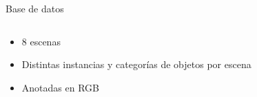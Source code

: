 \documentclass[]{beamer}
\begin{document}
\begin{frame}{Base de datos}
\begin{columns}[t]
\begin{column}{5cm}
            \begin{itemize}
                \item 8 escenas
                \item Distintas instancias y categorías de objetos por escena
                \item Anotadas en RGB
            \end{itemize}

        \end{column}
    \end{columns}
\end{frame}

%
%
\end{document}
